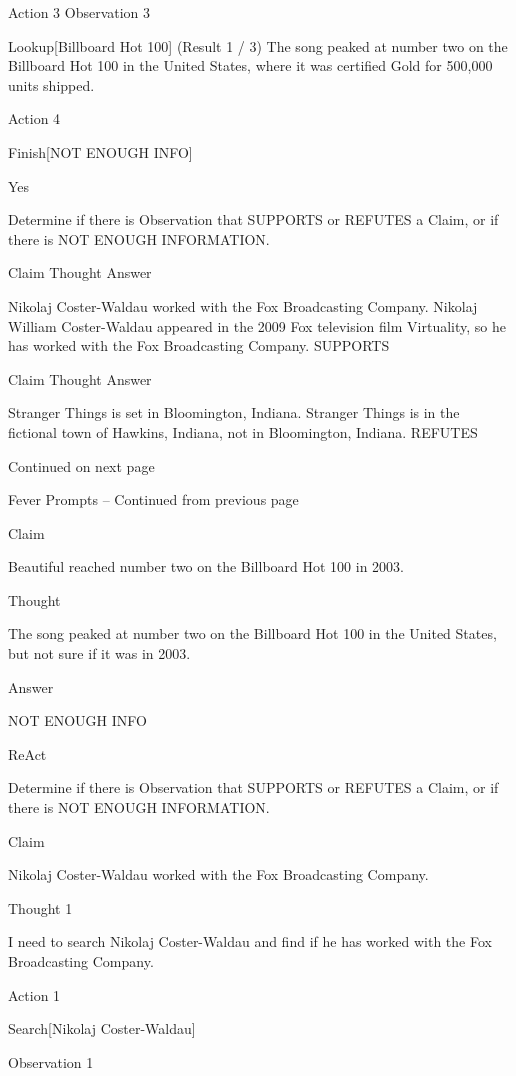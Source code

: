\documentclass[
]{article}
\begin{document}
Action 3 Observation 3

Lookup{[}Billboard Hot 100{]} (Result 1 / 3) The song peaked at number
two on the Billboard Hot 100 in the United States, where it was
certified Gold for 500,000 units shipped.

Action 4

Finish{[}NOT ENOUGH INFO{]}

Yes

Determine if there is Observation that SUPPORTS or REFUTES a Claim, or
if there is NOT ENOUGH INFORMATION.

Claim Thought Answer

Nikolaj Coster-Waldau worked with the Fox Broadcasting Company. Nikolaj
William Coster-Waldau appeared in the 2009 Fox television film
Virtuality, so he has worked with the Fox Broadcasting Company. SUPPORTS

Claim Thought Answer

Stranger Things is set in Bloomington, Indiana. Stranger Things is in
the fictional town of Hawkins, Indiana, not in Bloomington, Indiana.
REFUTES

Continued on next page

Fever Prompts -- Continued from previous page

Claim

Beautiful reached number two on the Billboard Hot 100 in 2003.

Thought

The song peaked at number two on the Billboard Hot 100 in the United
States, but not sure if it was in 2003.

Answer

NOT ENOUGH INFO

ReAct

Determine if there is Observation that SUPPORTS or REFUTES a Claim, or
if there is NOT ENOUGH INFORMATION.

Claim

Nikolaj Coster-Waldau worked with the Fox Broadcasting Company.

Thought 1

I need to search Nikolaj Coster-Waldau and find if he has worked with
the Fox Broadcasting Company.

Action 1

Search{[}Nikolaj Coster-Waldau{]}

Observation 1
\end{document}
